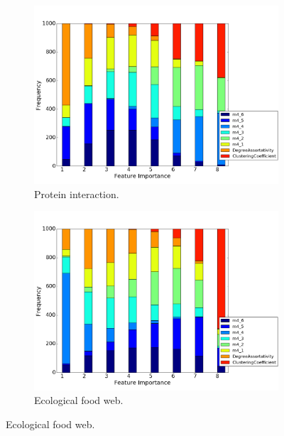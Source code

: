 \documentclass[..]{revtex4}
\begin{document}
\begin{figure}[H]
\begin{subfigure}{0.48\textwidth}
\includegraphics[width=\linewidth]{figs/one_by_many/protein/feature_importance.png}
\caption{Protein interaction.} \label{protein_feature}
\end{subfigure}\hspace*{\fill}
\begin{subfigure}{0.48\textwidth}
\includegraphics[width=\linewidth]{figs/one_by_many/food_web/feature_importance.png}
\caption{Ecological food web.} \label{foodweb_feature}
\end{subfigure}


\end{figure}
\end{document}
